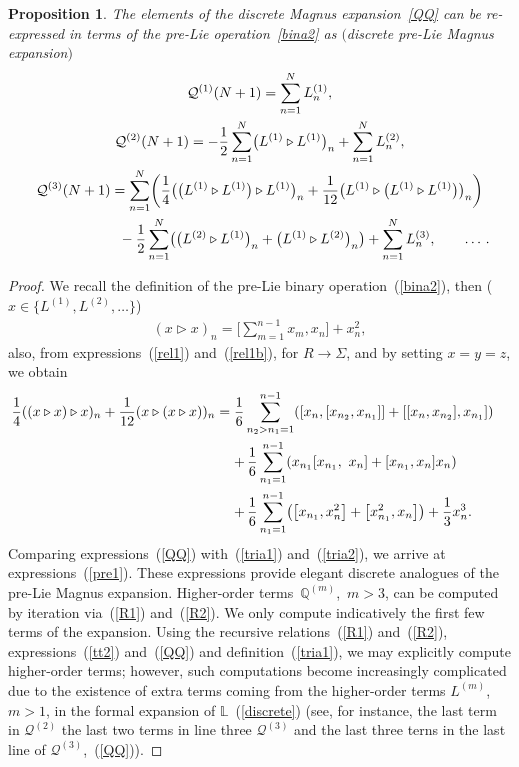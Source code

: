 \documentclass[pdftex]{sigma}
\numberwithin{equation}{section}
\newtheorem{pro}[thm]{Proposition}
\theoremstyle{definition}
\begin{document}
\begin{pro} \label{prom}
The elements of the discrete Magnus expansion~\eqref{QQ} can be re-expressed in terms of the pre-Lie operation~\eqref{bina2} as $(${\it discrete pre-Lie Magnus expansion}$)$
\begin{gather}
 {\mathcal Q}^{(1)}(N+1) = \sum_{n=1}^NL^{(1)}_n, \nonumber\\
 {\mathcal Q}^{(2)}(N+1) =-\frac{1}{2} \sum_{n=1}^N
 \bigl(L^{(1)} \triangleright L^{(1)}\bigr)_n +\sum_{n=1}^NL_n^{(2)},\nonumber\\
 {\mathcal Q}^{(3)}(N+1)= \sum_{n=1}^N\biggl(
\frac{1}{4} \bigl(\bigl(L^{(1)} \triangleright L^{(1)}\bigr) \triangleright L^{(1)}\bigr)_n +\frac{1}{12}
\bigl(L^{(1)} \triangleright \bigl(L^{(1)} \triangleright L^{(1)}\bigr)\bigr)_n \biggr)\nonumber\\
\hphantom{ {\mathcal Q}^{(3)}(N+1)=}{}
-\frac{1}{2} \sum_{n=1}^N\bigl(\bigl(L^{(2)} \triangleright L^{(1)}\bigr)_n+ \bigl(L^{(1)}\triangleright L^{(2)}\bigr)_n\bigr)
+ \sum_{n=1}^N L_n^{(3)},\qquad \dots\,. \label{pre1}
\end{gather}
\end{pro}
\begin{proof}
We recall the definition of the pre-Lie binary operation~(\ref{bina2}), then \big($x \in\bigl\{ L^{(1)}, L^{(2)}, \dots\bigr\}$\big)
\begin{gather}
(x \triangleright x) _n= \Biggl[\sum_{m=1}^{n-1}x_m, x_n \Biggr] +
x_n^2, \label{tria1}
\end{gather}
also, from expressions~(\ref{rel1}) and~(\ref{rel1b}), for $R \to \Sigma$, and by setting $x=y=z$, we obtain
\begin{align}
\frac{1}{4}((x \triangleright x) \triangleright x)_n +
\frac{1}{12} (x \triangleright (x \triangleright x))_n ={}& \frac{1}{6} \sum_{n_2>n_1=1}^{n-1}
 ([x_{n}, [x_{n_2}, x_{n_1} ] ] +
[[x_{n}, x_{n_2} ], x_{n_1} ]) \cr
&{+}\, \frac{1}{6} \sum_{n_1=1}^{n-1} ( x_{n_1}[x_{n_1},\
x_{n}] + [x_{n_1}, x_{n}] x_{n} ) \cr
&{+}\, \frac{1}{6} \sum_{n_1=1}^{n-1} \bigl(\bigl[x_{n_1}, x^2_{n}\bigr] +
\bigl[x^2_{n_1}, x_{n}\bigr] \bigr) +
\frac{1}{3} x^3_{n}. \label{tria2}
\end{align}
Comparing expressions~(\ref{QQ}) with~(\ref{tria1}) and~(\ref{tria2}), we arrive at expressions~(\ref{pre1}).
These expressions provide elegant discrete analogues of the pre-Lie Magnus expansion. Higher-order terms~${\mathbb Q}^{(m)}$,~${m>3}$, can be computed by iteration via~(\ref{R1}) and~(\ref{R2}).
We only compute indicatively the first few terms of the expansion. Using the recursive relations~(\ref{R1}) and~(\ref{R2}),
expressions~(\ref{tt2}) and~(\ref{QQ}) and definition~(\ref{tria1}), we may explicitly compute higher-order terms; however, such
computations become increasingly complicated due to the existence of extra terms coming from the higher-order terms $L^{(m)}$, $m>1$,
in the formal expansion of ${\mathbb L}$~(\ref{discrete}) (see, for instance, the last term in ${\mathcal Q}^{(2)}$ the last two terms in line three ${\mathcal Q}^{(3)}$ and the last three terns in the last line of
${\mathcal Q}^{(3)}$,~(\ref{QQ})).
\end{proof}
\end{document}
